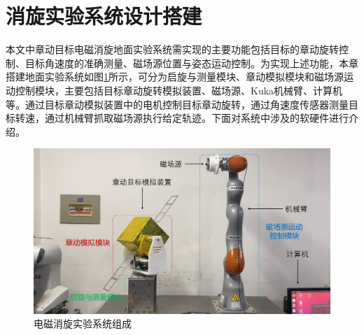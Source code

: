 \documentclass[lang=chs, degree=master, blindreview=false, winfonts=true]{yanputhesis}
\begin{document}
\section{消旋实验系统设计搭建}
本文中章动目标电磁消旋地面实验系统需实现的主要功能包括目标的章动旋转控制、目标角速度的准确测量、磁场源位置与姿态运动控制。为实现上述功能，本章搭建地面实验系统如图\ref{fig:exp_sys}所示，可分为启旋与测量模块、章动模拟模块和磁场源运动控制模块，主要包括目标章动旋转模拟装置、磁场源、Kuka机械臂、计算机等。通过目标章动模拟装置中的电机控制目标章动旋转，通过角速度传感器测量目标转速，通过机械臂抓取磁场源执行给定轨迹。下面对系统中涉及的软硬件进行介绍。
\begin{figure}[htbp]
	\centering
	\includegraphics[width = 5.4in]{picture/experiment_sys.png}
	\caption{电磁消旋实验系统组成}
	\label{fig:exp_sys}
\end{figure}
\end{document}
